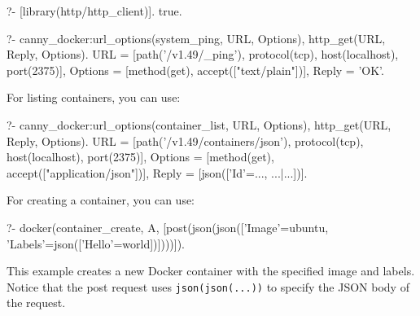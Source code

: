 \begin{code}
?- [library(http/http_client)].
true.

?- canny_docker:url_options(system_ping, URL, Options),
   http_get(URL, Reply, Options).
URL = [path('/v1.49/_ping'), protocol(tcp), host(localhost), port(2375)],
Options = [method(get), accept(["text/plain"])],
Reply = 'OK'.
\end{code}

For listing containers, you can use:

\begin{code}
?- canny_docker:url_options(container_list, URL, Options),
   http_get(URL, Reply, Options).
URL = [path('/v1.49/containers/json'), protocol(tcp), host(localhost), port(2375)],
Options = [method(get), accept(["application/json"])],
Reply = [json(['Id'=..., ...|...])].
\end{code}

For creating a container, you can use:

\begin{code}
?- docker(container_create, A, [post(json(json(['Image'=ubuntu,
   'Labels'=json(['Hello'=world])])))]).
\end{code}

This example creates a new Docker container with the specified image and labels.
Notice that the post request uses \verb$json(json(...))$ to specify the JSON body of
the request.\vspace{0.7cm}

